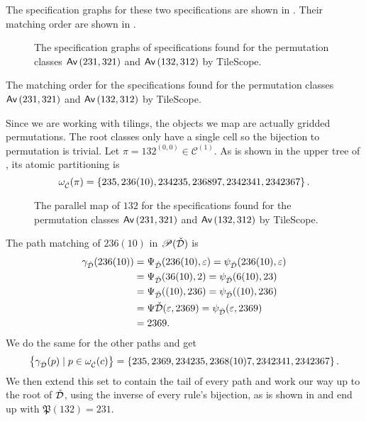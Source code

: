 The specification graphs for these two specifications are shown in . Their matching order are shown in .

\begin{figure}[ht!]
    \centering
    
    \caption{The specification graphs of specifications found for the permutation classes $\textsf{Av}\left(231,321\right)$ and $\textsf{Av}\left(132,312\right)$ by TileScope.}
    \label{fig:avexspecgraphs}
\end{figure}

\begin{table}[ht!]
    \centering
    
    \caption{The matching order for the specifications found for the permutation classes $\textsf{Av}\left(231,321\right)$ and $\textsf{Av}\left(132,312\right)$ by TileScope.}
    \label{tab:avexmatchingorder}
\end{table}

Since we are working with tilings, the objects we map are actually gridded permutations. The root classes only have a single cell so the bijection to permutation is trivial. Let $\pi=132^{(0,0)} \in \mathcal{C}^{(1)}$. As is shown in the upper tree of , its atomic partitioning is 
\[
    \omega_{\check{\mathcal{C}}}(\pi) = \left\{235, 236(10), 234235,236897,2342341,2342367\right\}.
\]

\begin{figure}[ht!]
    \centering
    
    \caption{The parallel map of $132$ for the specifications found for the permutation classes $\textsf{Av}\left(231,321\right)$ and $\textsf{Av}\left(132,312\right)$ by TileScope.}
    \label{fig:mapexap}
\end{figure}

The path matching of $236(10)$ in $\mathscr{P}(\check{\mathcal{D}})$ is
\begin{align*}
\gamma_{\check{\mathcal{D}}}(236(10)) &= \Psi_{\check{\mathcal{D}}}(236(10),\varepsilon) = \psi_{\check{\mathcal{D}}}(236(10), \varepsilon) \\
&= \Psi_{\check{\mathcal{D}}}(36(10),2) = \psi_{\check{\mathcal{D}}}(6(10),23) \\
&= \Psi_{\check{\mathcal{D}}}((10),236) = \psi_{\check{\mathcal{D}}}((10),236) \\
&= \Psi{\check{\mathcal{D}}}(\varepsilon, 2369) = \psi_{\check{\mathcal{D}}}(\varepsilon, 2369) \\
&= 2369.
\end{align*}
We do the same for the other paths and get
\[
    \left\{\gamma_{\check{\mathcal{D}}}(p) \mid p \in \omega_{\check{\mathcal{C}}}(c)\right\} = \left\{235, 2369, 234235,2368(10)7,2342341,2342367\right\}.
\]
We then extend this set to contain the tail of every path and work our way up to the root of $\check{\mathcal{D}}$, using the inverse of every rule's bijection, as is shown in  and end up with $\mathfrak{P}(132) = 231$.

